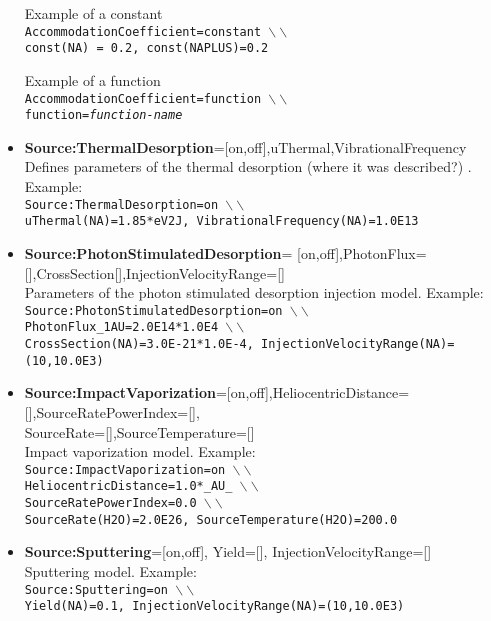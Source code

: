 \begin{itemize}
Example of a constant \\ {\tt AccommodationCoefficient=constant $\backslash\backslash$ \\ const(NA) = 0.2, const(NAPLUS)=0.2}

Example of a function \\ {\tt AccommodationCoefficient=function $\backslash\backslash$ \\ function={\it function-name}}


\item {\bf Source:ThermalDesorption}=[on,off],uThermal,VibrationalFrequency \\ Defines parameters of the thermal desorption (where it was described?)   . Example: \\ {\tt Source:ThermalDesorption=on $\backslash\backslash$ \\ uThermal(NA)=1.85*eV2J, VibrationalFrequency(NA)=1.0E13}
 

\item {\bf Source:PhotonStimulatedDesorption}= [on,off],PhotonFlux=[],CrossSection[],InjectionVelocityRange=[] \\ Parameters of the photon stimulated desorption injection model. Example: \\   {\tt Source:PhotonStimulatedDesorption=on $\backslash\backslash$ \\ PhotonFlux\_1AU=2.0E14*1.0E4 $\backslash\backslash$ \\ CrossSection(NA)=3.0E-21*1.0E-4, InjectionVelocityRange(NA)=(10,10.0E3)}

\item {\bf Source:ImpactVaporization}=[on,off],HeliocentricDistance=[],SourceRatePowerIndex=[], \\ SourceRate=[],SourceTemperature=[] \\ Impact vaporization model. Example: \\ {\tt Source:ImpactVaporization=on $\backslash\backslash$ \\ HeliocentricDistance=1.0*\_AU\_ $\backslash\backslash$ \\ SourceRatePowerIndex=0.0 $\backslash\backslash$ \\ SourceRate(H2O)=2.0E26, SourceTemperature(H2O)=200.0} 

\item {\bf Source:Sputtering}=[on,off], Yield=[], InjectionVelocityRange=[] \\ Sputtering model. Example: \\ {\tt Source:Sputtering=on $\backslash\backslash$ \\ Yield(NA)=0.1, InjectionVelocityRange(NA)=(10,10.0E3)}


\end{itemize}
